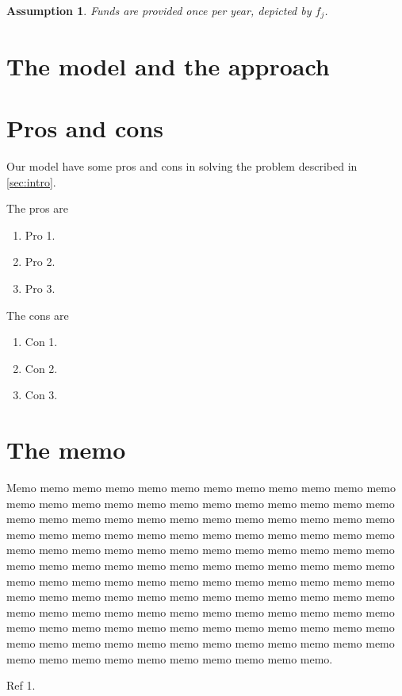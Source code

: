 \documentclass{article}
\newtheorem{assumption}{Assumption}
\begin{document}
\begin{assumption}
Funds are provided once per year, depicted by $f_j$.
\end{assumption}

\section{The model and the approach}
\label{sec:model}

\section{Pros and cons}

Our model have some pros and cons in solving the problem described in \ref{sec:intro}.

The pros are
\begin{enumerate}
\item Pro 1.
\item Pro 2.
\item Pro 3.
\end{enumerate}

The cons are
\begin{enumerate}
\item Con 1.
\item Con 2.
\item Con 3.
\end{enumerate}

\newpage

\section{The memo}
\label{sec:memo}

Memo memo memo memo memo memo memo memo memo memo memo memo memo memo memo memo memo memo memo memo memo memo memo memo memo memo memo memo memo memo memo memo memo memo memo memo memo memo memo memo memo memo memo memo memo memo memo memo memo memo memo memo memo memo memo memo memo memo memo memo memo memo memo memo memo memo memo memo memo memo memo memo memo memo memo memo memo memo memo memo memo memo memo memo memo memo memo memo memo memo memo memo memo memo memo memo memo memo memo memo memo memo memo memo memo memo memo memo memo memo memo memo memo memo memo memo memo memo memo memo memo memo memo memo memo memo memo memo memo memo memo memo memo memo memo memo memo memo memo memo memo memo.

\newpage

\begin{thebibliography}{9}
\item Ref 1.
\end{thebibliography}
\end{document}
